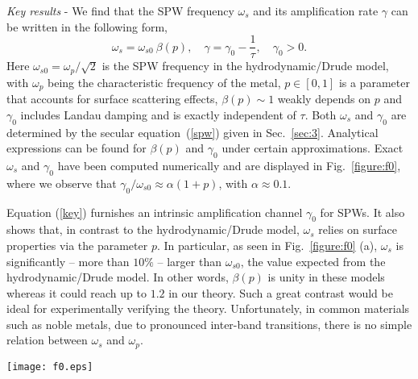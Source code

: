 \documentclass[aps,reprint]{revtex4-1}
\begin{document}
\textit{Key results} - We find that the SPW frequency $\omega_s$ and its amplification rate $\gamma$ can be written in the following form, 
\begin{equation}
\omega_s = \omega_{s0}~\beta(p), \quad \gamma = \gamma_0 -\frac{1}{\tau}, \quad \gamma_0>0. \label{key}
\end{equation}
Here $\omega_{s0} = \omega_p/\sqrt{2}$ is the SPW frequency in the hydrodynamic/Drude model, with $\omega_p$ being the characteristic frequency of the metal, $p\in[0,1]$ is a parameter that accounts for surface scattering effects, $\beta(p) \sim 1$ weakly depends on $p$ and $\gamma_0$ includes Landau damping and is exactly independent of $\tau$. Both $\omega_s$ and $\gamma_0$ are determined by the secular equation~(\ref{spw}) given in Sec.~\ref{sec:3}. Analytical expressions can be found for $\beta(p)$ and $\gamma_0$ under certain approximations. Exact $\omega_s$ and $\gamma_0$ have been computed numerically and are displayed in Fig.~\ref{figure:f0}, where we observe that $\gamma_0/\omega_{s0}\approx \alpha(1+p)$, with $\alpha \approx 0.1$.  

Equation (\ref{key}) furnishes an intrinsic amplification channel $\gamma_0$ for SPWs. It also shows that, in contrast to the hydrodynamic/Drude model, $\omega_s$ relies on surface properties via the parameter $p$. In particular, as seen in Fig.~\ref{figure:f0} (a), $\omega_s$ is significantly -- more than $10\%$ -- larger than $\omega_{s0}$, the value expected from the hydrodynamic/Drude model. In other words, $\beta(p)$ is unity in these models whereas it could reach up to $1.2$ in our theory. Such a great contrast would be ideal for experimentally verifying the theory. Unfortunately, in common materials such as noble metals, due to pronounced inter-band transitions, there is no simple relation between $\omega_s$ and $\omega_p$. 

\begin{figure*}
\begin{center}
\texttt{[image: f0.eps]}
\end{center}
\caption{Numerically calculated SPW frequency $\omega_s$ and its intrinsic amplification rate $\gamma_0$ as a function of the \textit{Fuchs} parameter $p$, by equation (\ref{spw}). $k/k_s=0.1$ and $q_c/k_s=1.5$. The approximate analytical solutions are also shown. \label{figure:f0}}
\end{figure*} 
\end{document}
